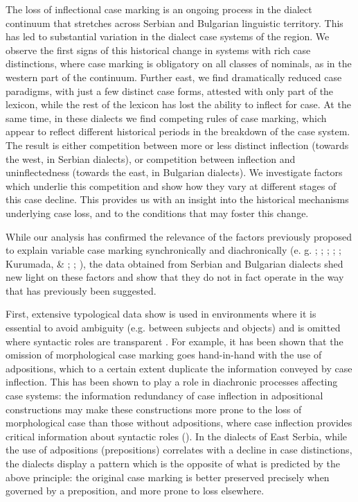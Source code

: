 \documentclass[output=paper]{langscibook}
\begin{document}
The loss of inflectional case marking is an ongoing process in the dialect continuum that stretches across Serbian and Bulgarian linguistic territory. This has led to substantial variation in the dialect case systems of the region. We observe the first signs of this historical change in systems with rich case distinctions, where case marking is obligatory on all classes of nominals, as in the western part of the continuum. Further east, we find dramatically reduced case paradigms, with just a few distinct case forms, attested with only part of the lexicon, while the rest of the lexicon has lost the ability to inflect for case. At the same time, in these dialects we find competing rules of case marking, which appear to reflect different historical periods in the breakdown of the case system. The result is either competition between more or less distinct inflection (towards the west, in Serbian dialects), or competition between inflection and uninflectedness (towards the east, in Bulgarian dialects). We investigate factors which underlie this competition and show how they vary at different stages of this case decline. This provides us with an insight into the historical mechanisms underlying case loss, and to the conditions that may foster this change.

While our analysis has confirmed the relevance of the factors previously proposed to explain variable case marking synchronically and diachronically (e. g. \citealt{Moravcsik1978}; \citealt{Bossong1991}; \citealt{König2008}; \citealt{DalrympleNikolaeva2011}; \citealt{Cristofaro2013}; Kurumada, \& \citealt{Jaeger2015}; \citealt{Witzlack-MakarevichSeržant2018}; \citealt{SeržantWitzlack-Makarevich2018}), the data obtained from Serbian and Bulgarian dialects shed new light on these factors and show that they do not in fact operate in the way that has previously been suggested. 

First, extensive typological data show  is used in environments where it is essential to avoid ambiguity (e.g. between subjects and objects) and is omitted where syntactic roles are transparent \citep{Comrie1977}. For example, it has been shown that the omission of morphological case marking goes hand-in-hand with the use of adpositions, which to a certain extent duplicate the information conveyed by case inflection. This has been shown to play a role in diachronic processes affecting case systems: the information redundancy of case inflection in adpositional constructions may make these constructions more prone to the loss of morphological case than those without adpositions, where case inflection provides critical information about syntactic roles (\citealt{HewsonBubenik2006}). In the dialects of East Serbia, while the use of adpositions (prepositions) correlates with a decline in case distinctions, the dialects display a pattern which is the opposite of what is predicted by the above principle: the original case marking is better preserved precisely when governed by a preposition, and more prone to loss elsewhere.
\end{document}
